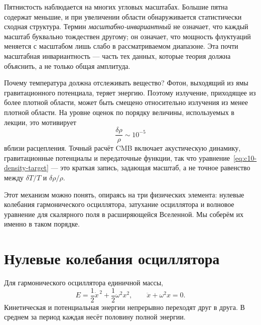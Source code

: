 Пятнистость наблюдается на многих угловых масштабах. Большие пятна содержат меньшие, и при увеличении области обнаруживается статистически сходная структура. Термин \emph{масштабно-инвариантный} не означает, что каждый масштаб буквально тождествен другому; он означает, что мощность флуктуаций меняется с масштабом лишь слабо в рассматриваемом диапазоне. Эта почти масштабная инвариантность — часть тех данных, которые теория должна объяснить, а не только общая амплитуда.

Почему температура должна отслеживать вещество? Фотон, выходящий из ямы гравитационного потенциала, теряет энергию. Поэтому излучение, приходящее из более плотной области, может быть смещено относительно излучения из менее плотной области. На уровне оценок по порядку величины, используемых в лекции, это мотивирует
\begin{equation}
\frac{\delta\rho}{\rho}\sim10^{-5}
\label{eq:c10-density-target}
\end{equation}
вблизи расцепления. Точный расчёт CMB включает акустическую динамику, гравитационные потенциалы и передаточные функции, так что уравнение~\eqref{eq:c10-density-target} — это краткая запись, задающая масштаб, а не точное равенство между \(\delta T/T\) и \(\delta\rho/\rho\).

\begin{classroomqa}
\end{classroomqa}

Этот механизм можно понять, опираясь на три физических элемента: нулевые колебания гармонического осциллятора, затухание осциллятора и волновое уравнение для скалярного поля в расширяющейся Вселенной. Мы соберём их именно в таком порядке.

\section{Нулевые колебания осциллятора}

Для гармонического осциллятора единичной массы,
\begin{equation}
E=\frac12\dot x^{\,2}+\frac12\omega^2x^2,
\qquad
\ddot x+\omega^2x=0.
\label{eq:c10-undamped}
\end{equation}
Кинетическая и потенциальная энергии непрерывно переходят друг в друга. В среднем за период каждая несёт половину полной энергии.

